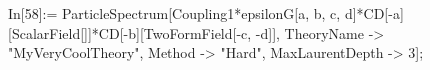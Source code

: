 In[58]:= ParticleSpectrum[Coupling1*epsilonG[a, b, c, d]*CD[-a][ScalarField[]]*CD[-b][TwoFormField[-c, -d]], TheoryName -> "MyVeryCoolTheory", Method -> "Hard", MaxLaurentDepth -> 3]; 